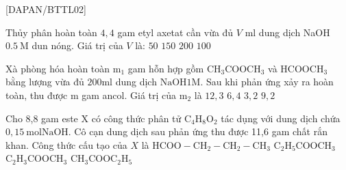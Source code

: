 [DAPAN/BTTL02]
\begin{ex}[1][Cơ bản]
	Thủy phân hoàn toàn $ 4,4  $ gam etyl axetat cần vừa đủ $ V $ ml dung dịch NaOH $ 0.5~\mathrm{M} $ dun nóng. Giá trị của $ V $ là:
	\choice
	{%
	$ 50 $
}
	{%
	$ 150 $
}
	{%
	$ 200 $
}
	{%
\True $ 100 $
}

\sodongkeex[4]
\end{ex}
\begin{ex}[2][]
	Xà phòng hóa hoàn toàn $\mathrm{m}_1$ gam hỗn hợp gồm $\mathrm{CH}_3 \mathrm{COOCH}_3$ và $\mathrm{HCOOCH}_3$ bằng lượng vừa đủ $200 \mathrm{ml}$ dung dịch $\mathrm{NaOH} 1 \mathrm{M}$. Sau khi phản ứng xảy ra hoàn toàn, thu được $\mathrm{m}$ gam ancol. Giá trị của $\mathrm{m}_2$ là                                                                      
	\choice
	{%
		$ 12,3 $
	}
	{%
		\True $ 6,4 $
	}
	{%
		$ 3,2 $
	}
	{%
		 $ 9,2 $
	}
\sodongkeex[4]
\end{ex}
\begin{ex}[2][]
	Cho 8,8 gam este $\mathrm{X}$ có công thức phân tử $\mathrm{C}_4 \mathrm{H}_8 \mathrm{O}_2$ tác dụng với dung dịch chứa $0,15 \mathrm{~mol} \mathrm{NaOH}$. Cô cạn dung dịch sau phản ứng thu được 11,6 gam chất rắn khan. Công thức cấu tạo của $X$ là                                                                  
	\choice
	{%
		$\mathrm{HCOO}-\mathrm{CH}_2-\mathrm{CH}_2-\mathrm{CH}_3$
	}
	{%
	\True $\mathrm{C}_2 \mathrm{H}_5 \mathrm{COOCH}_3$
	}
	{%
		$\mathrm{C}_2 \mathrm{H}_3 \mathrm{COOCH}_3$
	}
	{%
		$\mathrm{CH}_3 \mathrm{COOC}_2 \mathrm{H}_5$
	}
	\sodongkeex[5]
\end{ex}
